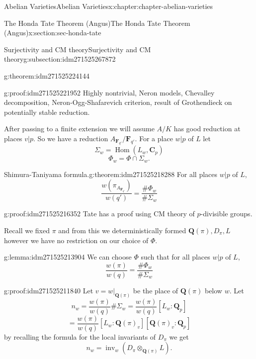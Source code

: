 \documentclass[oneside,10pt,]{book}
\numberwithin{equation}{section}
\newcommand{\QQ}{\mathbf{Q}}
\newcommand{\CC}{\mathbf{C}}
\newcommand{\FF}{\mathbf{F}}
\DeclareMathOperator{\Hom}{Hom}
\begin{document}
\begin{chapterptx}{Abelian Varieties}{}{Abelian Varieties}{}{}{x:chapter:chapter-abelian-varieties}
\begin{sectionptx}{The Honda Tate Theorem (Angus)}{}{The Honda Tate Theorem (Angus)}{}{}{x:section:sec-honda-tate}
\begin{subsectionptx}{Surjectivity and CM theory}{}{Surjectivity and CM theory}{}{}{g:subsection:idm271525267872}
\begin{theorem}{}{}{g:theorem:idm271525224144}
\end{theorem}
\begin{proofptx}{}{g:proof:idm271525221952}
Highly nontrivial, Neron models, Chevalley decomposition, Neron-Ogg-Shafarevich criterion, result of Grothendieck on potentially stable reduction.%
\end{proofptx}
After passing to a finite extension we will assume \(A/K\) has good reduction at places \(v|p\). So we have a reduction \(A_{\FF_{q'}}/\FF_{q'}\). For a place \(w|p\) of \(L\) let%
\begin{equation*}
\Sigma_w = \Hom(L_w, \CC_p)
\end{equation*}
%
\begin{equation*}
\Phi_w = \Phi \cap \Sigma_w\text{.}
\end{equation*}
%
\begin{theorem}{Shimura-Taniyama formula.}{}{g:theorem:idm271525218288}%
For all places \(w|p\) of \(L\),%
\begin{equation*}
\frac{w(\pi_{A_{\FF_{q'}}})}{w(q')} = \frac{\#\Phi_w}{\#\Sigma_w}
\end{equation*}
%
\end{theorem}
\begin{proofptx}{}{g:proof:idm271525216352}
Tate has a proof using CM theory of \(p\)-divisible groups.%
\end{proofptx}
Recall we fixed \(\pi\) and from this we deterministically formed \(\QQ(\pi), D_{\pi}, L\) however we have no restriction on our choice of \(\Phi\).%
\begin{lemma}{}{}{g:lemma:idm271525213904}%
We can choose \(\Phi\) such that for all places \(w|p\) of \(L\),%
\begin{equation*}
\frac{w(\pi)}{w(q)} = \frac{\#\Phi_w}{\#\Sigma_w}
\end{equation*}
%
\end{lemma}
\begin{proofptx}{}{g:proof:idm271525211840}
Let \(v = w|_{\QQ(\pi)}\) be the place of \(\QQ(\pi)\) below \(w\). Let%
\begin{equation*}
n_w = \frac{w(\pi)}{w(q)}\#\Sigma_w = \frac{w(\pi)}{w(q)}[L_w :\QQ_p]
\end{equation*}
%
\begin{equation*}
= \frac{w(\pi)}{w(q)}[L_w :\QQ(\pi)_v ][ \QQ(\pi)_v:\QQ_p]
\end{equation*}
by recalling the formula for the local invariants of \(D_\pi\) we get%
\begin{equation*}
n_w = \operatorname{inv}_w(D_\pi\otimes_{\QQ(\pi)} L)\text{.}

\end{equation*}
\end{proofptx}
\end{subsectionptx}
\end{sectionptx}
\end{chapterptx}
\end{document}

